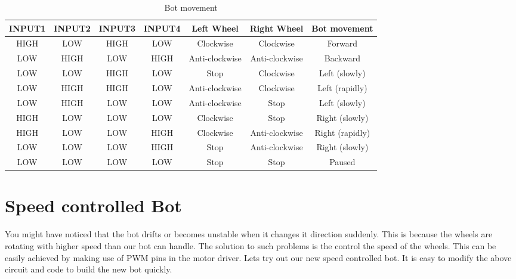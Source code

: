 \begin{table}
    \centering
    \renewcommand{\arraystretch}{1.5}
    \vspace{3mm}
    \begin{tabular}{|c|c|c|c|c|c|c|}
    \hline
        \textbf{INPUT1} & \textbf{INPUT2} & \textbf{INPUT3} & \textbf{INPUT4} & \textbf{Left Wheel} & \textbf{Right Wheel} & \textbf{Bot movement} \\ \hline
        HIGH & LOW & HIGH & LOW & Clockwise & Clockwise & Forward \\ \hline
        LOW & HIGH & LOW & HIGH & Anti-clockwise & Anti-clockwise & Backward \\ \hline
        LOW & LOW & HIGH & LOW & Stop & Clockwise & Left (slowly) \\ \hline
        LOW & HIGH & HIGH & LOW & Anti-clockwise & Clockwise & Left (rapidly) \\ \hline
        LOW & HIGH & LOW & LOW & Anti-clockwise & Stop & Left (slowly) \\ \hline
        HIGH & LOW & LOW & LOW & Clockwise & Stop & Right (slowly) \\ \hline
        HIGH & LOW & LOW & HIGH & Clockwise & Anti-clockwise & Right (rapidly) \\ \hline
        LOW & LOW & LOW & HIGH & Stop & Anti-clockwise & Right (slowly) \\ \hline
        LOW & LOW & LOW & LOW & Stop & Stop & Paused \\ \hline
    \end{tabular}
    \caption{Bot movement}
    \label{tab:move1_table}
\end{table}
\renewcommand{\arraystretch}{1}

\section{Speed controlled Bot}
\label{section:speed_controlled_bot}

\par You might have noticed that the bot drifts or becomes unstable when it changes it direction suddenly. This is because the wheels are rotating with higher speed than our bot can handle. The solution to such problems is the control the speed of the wheels. This can be easily achieved by making use of \ac{PWM} pins in the motor driver. Lets try out our new speed controlled bot. It is easy to modify the above circuit and code to build the new bot quickly.

